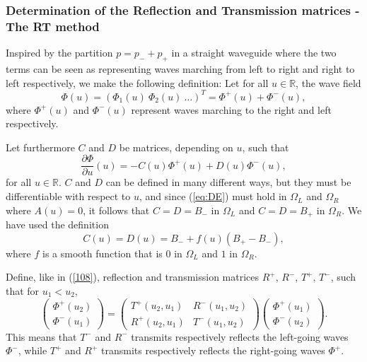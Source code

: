 \documentclass[numreferences]{kluwer}
\renewcommand{\Phi}{\varPhi}
\renewcommand{\vec}[1]{\bm{#1}}
\newcommand{\R}{\mathbb R}
\renewcommand{\Phi}{\varPhi}
\begin{document}
\subsubsection{Determination of the Reflection and Transmission
  matrices - The RT method}
\label{sec:RT}

Inspired by the partition $p=p_-+p_+$ in a straight waveguide where
the two terms can be seen as representing waves marching from left to
right and right to left respectively, we make the following
definition: Let for all $u\in\R$, the wave field
\begin{equation}
  \label{eq:Phipart1}
  \vec\Phi(u)=(\Phi_1(u)\ \Phi_2(u)\ \dots)^T
  =\vec\Phi^+(u)+\vec\Phi^-(u),
\end{equation}
where $\vec\Phi^+(u)$ and $\vec\Phi^-(u)$ represent waves marching to
the right and left respectively.

Let furthermore $C$ and $D$ be matrices, depending on $u$, such that
\begin{equation}
  \label{eq:plusminustodiff}
  \dfrac{\partial\vec\Phi}{\partial u}(u)=
  -C(u)\vec\Phi^+(u)+D(u)\vec\Phi^-(u),
\end{equation}
for all $u\in\R$. $C$ and $D$ can be defined in many different ways,
but they must be differentiable with respect to $u$, and since
(\ref{eq:DE}) must hold in $\Omega_L$ and $\Omega_R$ where $A(u)=0$,
it follows that $C=D=B_-$ in $\Omega_L$ and $C=D=B_+$ in
$\Omega_R$. We have used the definition
\begin{equation}
  \label{eq:CD}
  C(u)=D(u)=B_-+f(u)(B_+-B_-),
\end{equation}
where $f$ is a smooth function that is $0$ in $\Omega_L$ and $1$ in
$\Omega_R$.

Define, like in (\ref{108}), reflection and transmission matrices
$R^+$, $R^-$, $T^+$, $T^-$, such that for $u_1<u_2$,
\begin{equation}
  \label{eq:RT}
  \begin{pmatrix}
    \vec\Phi^+(u_2)\\
    \vec\Phi^-(u_1)
  \end{pmatrix}=
  \begin{pmatrix}
    T^+(u_2,u_1)&R^-(u_1,u_2)\\
    R^+(u_2,u_1)&T^-(u_1,u_2)
  \end{pmatrix}
  \begin{pmatrix}
    \vec\Phi^+(u_1)\\
    \vec\Phi^-(u_2)
  \end{pmatrix}.
\end{equation}
This means that $T^-$ and $R^-$ transmits respectively reflects the
left-going waves $\vec\Phi^-$, while $T^+$ and $R^+$ transmits
respectively reflects the right-going waves $\vec\Phi^+$.
\end{document}

